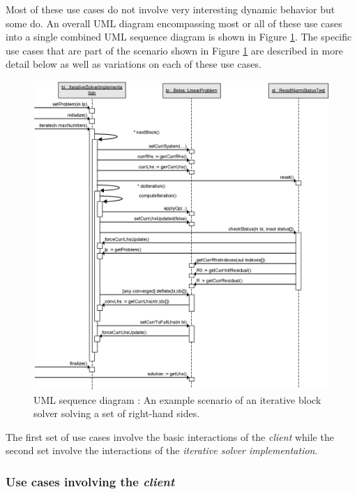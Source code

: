 \documentclass[pdf,ps2pdf,11pt]{SANDreport}
\begin{document}
Most of these use cases do not involve very interesting dynamic
behavior but some do.  An overall UML diagram encompassing most or all
of these use cases into a single combined UML sequence diagram is
shown in Figure {}\ref{belos:fig:BelosSequence}.  The specific use
cases that are part of the scenario shown in Figure
{}\ref{belos:fig:BelosSequence} are described in more detail below as
well as variations on each of these use cases.

{\bsinglespace
\begin{figure}
\begin{center}
\includegraphics*[scale=0.85]{BelosSequence}
\end{center}
\caption{
\label{belos:fig:BelosSequence}
UML sequence diagram : An example
scenario of an iterative block solver solving a set of right-hand
sides.}
\end{figure}
\esinglespace}

The first set of use cases involve the basic interactions of the
{}\textit{client} while the second set involve the interactions of the
{}\textit{iterative solver implementation}.

\subsubsection*{Use cases involving the {}\textit{client}}
\end{document}
